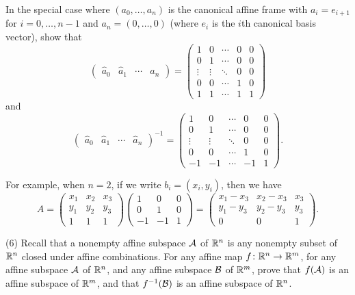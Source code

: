 \documentclass[12pt]{article}
\begin{document}
In the special case where  
$(a_0, \ldots, a_n)$ is the canonical  affine frame with 
$a_i = e_{i+1}$ for $i = 0, \ldots, n - 1$ and
$a_n = (0, \ldots, 0)$ 
(where $e_i$ is the $i$th canonical  basis vector), show that
\[
\begin{pmatrix}
\widehat{a}_0 & \widehat{a}_1 & \cdots & \widehat{a}_n   
\end{pmatrix}
= 
\begin{pmatrix}
1  & 0 & \cdots & 0 & 0 \\
0  & 1 & \cdots & 0 & 0\\
\vdots & \vdots & \ddots & 0 & 0 \\
0  &  0  & \cdots & 1 & 0 \\
1  &  1  & \cdots & 1 & 1
\end{pmatrix}
\] 
and
\[
\begin{pmatrix}
\widehat{a}_0 & \widehat{a}_1 & \cdots & \widehat{a}_n   
\end{pmatrix}^{-1}
= 
\begin{pmatrix}
1  & 0 & \cdots & 0 & 0\\
0  & 1 & \cdots & 0 & 0\\
\vdots & \vdots & \ddots & 0 & 0 \\
0  &  0  & \cdots & 1 & 0 \\
-1  &  -1  & \cdots & -1 & 1
\end{pmatrix} .
\]

For example, when $n = 2$, if we write $b_i = (x_i, y_i)$, then
we have
\[
A = 
\begin{pmatrix}
x_1 & x_2 & x_3 \\
y_1 & y_2&  y_3 \\
1  &   1 & 1
\end{pmatrix} 
\begin{pmatrix}
1 & 0 & 0 \\
0 & 1 & 0\\
-1 & -1 & 1
\end{pmatrix} 
= 
\begin{pmatrix}
x_1 - x_3 & x_2 -x_3 & x_3 \\
y_1 - y_3 & y_2 - y_3 &  y_3 \\
0  &   0 & 1
\end{pmatrix} .
\]

\medskip
(6)
Recall that a nonempty affine subspace ${\cal A}$ of $\mathbb{R}^n$ is 
any nonempty subset of  $\mathbb{R}^n$ closed under affine combinations.
For any affine map $f\colon \mathbb{R}^n\rightarrow \mathbb{R}^m$, for any
affine subspace ${\cal A}$ of $\mathbb{R}^n$, and any affine subspace ${\cal B}$ of
$\mathbb{R}^m$, prove that $f({\cal A})$ is an affine subspace of $\mathbb{R}^m$, and that
$f^{-1}({\cal B})$ is an affine subspace of $\mathbb{R}^n$.
\end{document}
